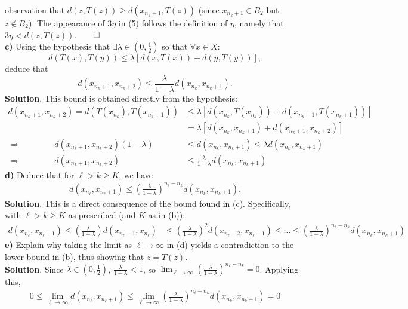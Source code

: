 \documentclass[10pt]{article}
\newcommand{\1}[1]{\mathbbm{1}_{#1}} \newcommand{\mc}[1]{\mathcal{#1}}
\begin{document}
    observation that $d(z,T(z))\geq d(x_{n_k+1},T(z))$ (since $x_{n_k+1}\in B_2$
    but $z\notin B_2$). The appearance of $3\eta$ in (5) follows the definition
    of $\eta$, namely that $3\eta<d(z,T(z))$.\hfill{$\qed$}\\[5pt]
    {\bf c)} Using the hypothesis that $\exists\lambda\in(0,\tfrac{1}{2})$ so
    that $\forall x\in X$:
    \[d(T(x),T(y))\leq \lambda\left[d(x,T(x))+d(y,T(y))\right],\] deduce that
    \[d(x_{n_k+1},x_{n_k+2})\leq\frac{\lambda}{1-\lambda}d(x_{n_k},x_{n_k+1}).\]
    {\bf Solution}. This bound is obtained directly from the hypothesis:
    \begin{align*}
        d(x_{n_k+1},x_{n_k+2})=d(T(x_{n_k}),T(x_{n_k+1}))&\leq\lambda\left[d(x_{n_k},T(x_{n_k}))+d(x_{n_k+1},T(x_{n_k+1}))\right]\\
        &=\lambda\left[d(x_{n_k},x_{n_k+1})+d(x_{n_k+1},x_{n_k+2})\right]\\
        \Rightarrow\qquad\qquad d(x_{n_k+1},x_{n_k+2})(1-\lambda)&\leq d(x_{n_k},x_{n_k+1})\leq \lambda d(x_{n_k},x_{n_k+1})\\
        \Rightarrow\qquad\qquad d(x_{n_k+1},x_{n_k+2})&\leq \frac{\lambda}{1-\lambda}d(x_{n_k},x_{n_k+1})\tag*{$\qed$}
    \end{align*}
    {\bf d)} Deduce that for $\ell>k\geq K$, we have
    \begin{align*}
        d(x_{n_\ell},x_{n_\ell+1})\leq\left(\frac{\lambda}{1-\lambda}\right)^{n_\ell-n_k}d(x_{n_k},x_{n_k+1}).
    \end{align*}
    {\bf Solution}. This is a direct consequence of the bound found in (c).
    Specifically, with $\ell>k\geq K$ as prescribed (and $K$ as in (b)):
    \begin{align*}
        d(x_{n_\ell},x_{n_\ell+1})\leq \left(\frac{\lambda}{1-\lambda}\right)d(x_{n_\ell-1},x_{n_\ell})&\leq \left(\frac{\lambda}{1-\lambda}\right)^2d(x_{n_\ell-2},x_{n_\ell-1})\leq\dots\leq \left(\frac{\lambda}{1-\lambda}\right)^{n_\ell-n_k}d(x_{n_k},x_{n_k+1})\tag{$\qed$}
    \end{align*}
    {\bf e)} Explain why taking the limit as $\ell\rightarrow\infty$ in (d)
    yields a contradiction to the lower bound in (b), thus showing that
    $z=T(z)$.\\[5pt]
    {\bf Solution}. Since $\lambda\in(0,\tfrac{1}{2})$,
    $\tfrac{\lambda}{1-\lambda}<1$, so
    $\lim_{\ell\rightarrow\infty}(\tfrac{\lambda}{1-\lambda})^{n_\ell-n_k}=0$.
    Applying this,
    \begin{align*}
        0\leq\lim_{\ell\rightarrow\infty}d(x_{n_\ell},x_{n_\ell+1})\leq\lim_{\ell\rightarrow\infty}\left(\frac{\lambda}{1-\lambda}\right)^{n_\ell-n_k}d(x_{n_k},x_{n_k+1})=0
    \end{align*}
\end{document}
